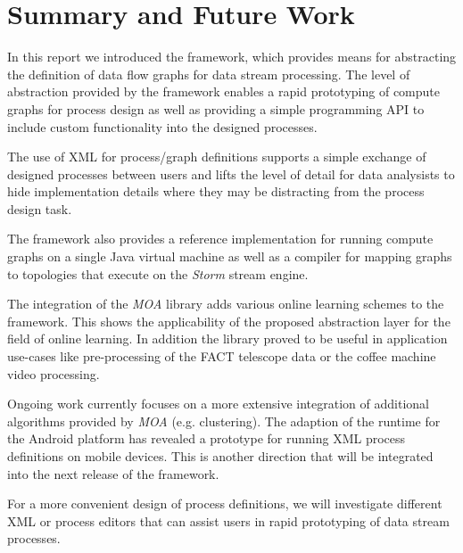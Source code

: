 \section{\label{sec:summary}Summary and Future Work}
In this report we introduced the \streams framework, which provides
means for abstracting the definition of data flow graphs for data
stream processing. The level of abstraction provided by the \streams
framework enables a rapid prototyping of compute graphs for process
design as well as providing a simple programming API to include
custom functionality into the designed processes.

The use of XML for process/graph definitions supports a simple
exchange of designed processes between users and lifts the level of
detail for data analysists to hide implementation details where they
may be distracting from the process design task.

The \streams framework also provides a reference implementation for
running compute graphs on a single Java virtual machine as well as a
compiler for mapping graphs to topologies that execute on the {\em
  Storm} stream engine.

The integration of the {\em MOA} library adds various online learning
schemes to the \streams framework. This shows the applicability of the
proposed abstraction layer for the field of online learning. In addition
the \streams library proved to be useful in application use-cases like
pre-processing of the FACT telescope data or the coffee machine video
processing.

\bigskip

Ongoing work currently focuses on a more extensive integration of
additional algorithms provided by {\em MOA} (e.g. clustering). The
adaption of the \streams runtime for the Android platform has revealed
a prototype for running XML process definitions on mobile devices. This
is another direction that will be integrated into the next release of
the \streams framework.

For a more convenient design of \streams process definitions, we will
investigate different XML or process editors that can assist users in
rapid prototyping of data stream processes.